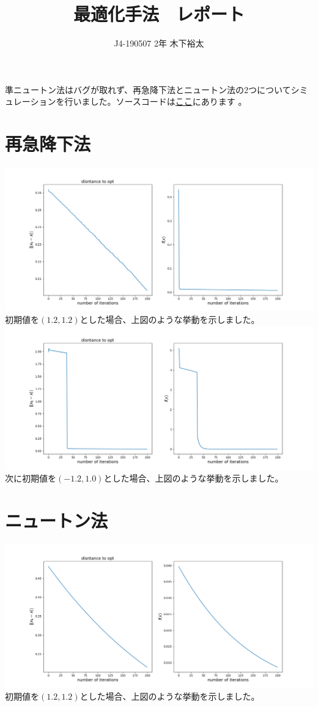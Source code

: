 \documentclass[uplatex,dvipdfmx]{jsarticle}
\title{最適化手法　レポート}
\author{J4-190507 2年 木下裕太}
\begin{document}
  \maketitle

  準ニュートン法はバグが取れず、再急降下法とニュートン法の2つについてシミュレーションを行いました。ソースコードは\href{https://github.com/jellc/optimization}{ここ}にあります 。\\

  \section{再急降下法}

  \includegraphics[scale=0.4]{out/steepest1.png}
  初期値を$(1.2, 1.2)$とした場合、上図のような挙動を示しました。\\


  \includegraphics[scale=0.4]{out/steepest2.png}
  次に初期値を$(-1.2, 1.0)$とした場合、上図のような挙動を示しました。\\


  \section{ニュートン法}

  \includegraphics[scale=0.4]{out/newton1.png}
  初期値を$(1.2, 1.2)$とした場合、上図のような挙動を示しました。\\
\end{document}
